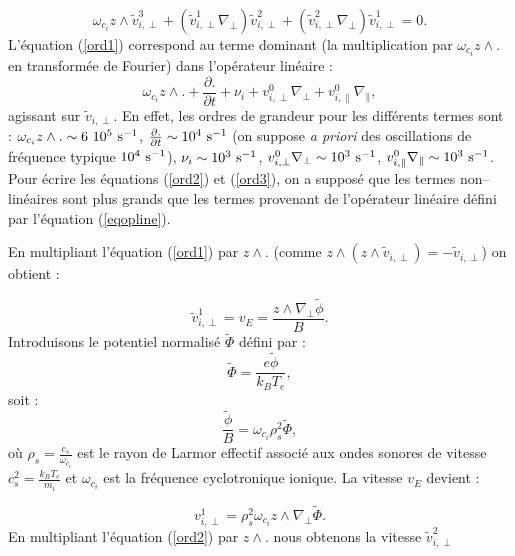 \documentclass{book}
\begin{document}
\begin{equation}\label{ord3}
\omega_{c_i}z\wedge \tilde{v}_{i,\perp}^3
+(\tilde{v}_{i,\perp}^1\nabla_\perp)\tilde{v}_{i,\perp}^2
+(\tilde{v}_{i,\perp}^2\nabla_\perp)\tilde{v}_{i,\perp}^1=0.
\end{equation}
L'\'equation (\ref{ord1}) correspond au terme dominant (la
multiplication par $\omega_{c_i}z\wedge .$ en transform\'ee de
Fourier) dans l'op\'erateur 
lin\'eaire : 
\begin{equation}\label{eqopline}
\omega_{c_i}z\wedge .+\frac{\partial.}{\partial t}
+ \nu_i
+{v}^0_{i,\perp}\nabla_\perp
+{v}^0_{i,\parallel}\nabla_\parallel,
\end{equation}
agissant sur $\tilde{v}_{i,\perp}$. En effet, les ordres de grandeur
pour les diff\'erents termes sont :
$\omega_{c_i}z\wedge .\sim 6\ 10^{5}\ {\rm s}^{-1}$,
$\frac{\partial.}{\partial t}\sim 10^{4}\ {\rm s}^{-1}$ (on suppose
{\it a priori}
des oscillations de fr\'equence typique $10^{4}\ {\rm s}^{-1}$),
$\nu_i\sim10^{3}\ {\rm s}^{-1}$, ${v}^0_{i,\perp}\nabla_\perp\sim
10^3\ {\rm s}^{-1}$, ${v}^0_{i,\parallel}\nabla_\parallel\sim
10^3\ {\rm s}^{-1}$.
Pour \'ecrire les \'equations (\ref{ord2}) et (\ref{ord3}), on a suppos\'e
que les termes non--lin\'eaires sont plus grands que les termes
provenant de l'op\'erateur lin\'eaire d\'efini par l'\'equation
(\ref{eqopline}). 


En multipliant l'\'equation (\ref{ord1}) par $z\wedge .$ (comme 
$z\wedge (z \wedge\tilde{v}_{i,\perp}) =-\tilde{v}_{i,\perp}$)
on obtient :

\begin{equation}
\tilde{v}_{i,\perp}^1=v_E=\frac{z\wedge\nabla_\perp\tilde{\phi}}{B}.
\end{equation}
Introduisons le potentiel normalis\'e $\tilde\Phi$ 
d\'efini par :
\begin{equation}
\tilde\Phi=\frac{e\tilde \phi}{k_B T_e},
\end{equation}
soit :
\begin{equation}
\frac{\tilde{\phi}}{B}=\omega_{c_i}\rho_s^2\tilde\Phi,
\end{equation}
o\`u $\rho_s=\frac{c_s}{\omega_{c_i}}$
est le rayon de Larmor effectif associ\'e aux ondes sonores de vitesse
$c_s^2=\frac{k_B T_e}{m_i}$ \cite{Chen84} 
et $\omega_{c_i}$ est la fr\'equence cyclotronique ionique.
La vitesse $v_E$ devient :

\begin{equation}
v_{i,\perp}^1=\rho_s^2\omega_{c_i}z\wedge\nabla_\perp\tilde\Phi.
\end{equation}
En multipliant l'\'equation (\ref{ord2}) par  $z\wedge .$  nous obtenons la vitesse
$\tilde{v}_{i,\perp}^2$ 
\end{document}
